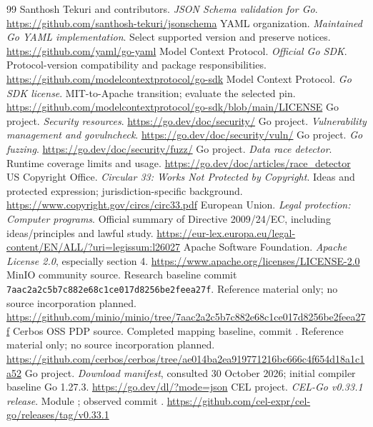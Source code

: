 \documentclass[11pt,a4paper]{article}
\begin{document}
\begin{thebibliography}{99}
 Santhosh Tekuri and contributors. \emph{JSON Schema validation for Go}. \url{https://github.com/santhosh-tekuri/jsonschema}
 YAML organization. \emph{Maintained Go YAML implementation}. Select supported version and preserve notices. \url{https://github.com/yaml/go-yaml}
 Model Context Protocol. \emph{Official Go SDK}. Protocol-version compatibility and package responsibilities. \url{https://github.com/modelcontextprotocol/go-sdk}
 Model Context Protocol. \emph{Go SDK license}. MIT-to-Apache transition; evaluate the selected pin. \url{https://github.com/modelcontextprotocol/go-sdk/blob/main/LICENSE}
 Go project. \emph{Security resources}. \url{https://go.dev/doc/security/}
 Go project. \emph{Vulnerability management and govulncheck}. \url{https://go.dev/doc/security/vuln/}
 Go project. \emph{Go fuzzing}. \url{https://go.dev/doc/security/fuzz/}
 Go project. \emph{Data race detector}. Runtime coverage limits and usage. \url{https://go.dev/doc/articles/race_detector}
 US Copyright Office. \emph{Circular 33: Works Not Protected by Copyright}. Ideas and protected expression; jurisdiction-specific background. \url{https://www.copyright.gov/circs/circ33.pdf}
 European Union. \emph{Legal protection: Computer programs}. Official summary of Directive 2009/24/EC, including ideas/principles and lawful study. \url{https://eur-lex.europa.eu/legal-content/EN/ALL/?uri=legissum:l26027}
 Apache Software Foundation. \emph{Apache License 2.0}, especially section 4. \url{https://www.apache.org/licenses/LICENSE-2.0}
 MinIO community source. Research baseline commit \texttt{7aac2a2c5b7c882e68c1ce017d8256be2feea27f}. Reference material only; no source incorporation planned. \url{https://github.com/minio/minio/tree/7aac2a2c5b7c882e68c1ce017d8256be2feea27f}
 Cerbos OSS PDP source. Completed mapping baseline, commit . Reference material only; no source incorporation planned. \url{https://github.com/cerbos/cerbos/tree/ae014ba2ea919771216bc666c4f654d18a1c1a52}
 Go project. \emph{Download manifest}, consulted 30 October 2026; initial compiler baseline Go 1.27.3. \url{https://go.dev/dl/?mode=json}
 CEL project. \emph{CEL-Go v0.33.1 release}. Module ; observed commit . \url{https://github.com/cel-expr/cel-go/releases/tag/v0.33.1}

\end{thebibliography}
\end{document}
